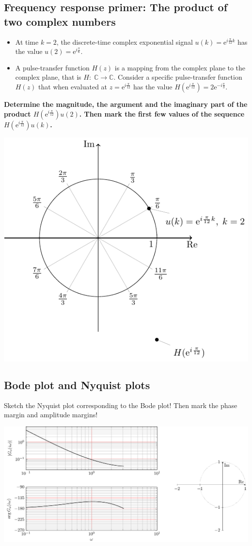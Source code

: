 \documentclass[letterpaper]{scrartcl}
\begin{document}
\subsection*{Frequency response primer: The product of two complex numbers}
\label{sec-1-2}
\begin{itemize}
\item At time \(k=2\), the discrete-time complex exponential signal \(u(k) = \mathrm{e}^{i\frac{\pi}{12}k}\) has the value \(u(2) = \mathrm{e}^{i\frac{\pi}{6}}\).
\item A pulse-transfer function \(H(z)\) is a mapping from the complex plane to the complex plane, that is \( H: \; \mathbb{C} \rightarrow \mathbb{C}\). Consider a specific pulse-transfer function \(H(z)\) that when evaluated at \(z=\mathrm{e}^{i\frac{\pi}{12}}\) has the value  \(H(\mathrm{e}^{i\frac{\pi}{12}}) = 2\mathrm{e}^{-i\frac{\pi}{3}}\).
\end{itemize}

\textbf{Determine the magnitude, the argument and the imaginary part of the product \(H(\mathrm{e}^{i\frac{\pi}{12}})u(2)\). Then mark the first few values of the sequence \(H(\mathrm{e}^{i\frac{\pi}{12}})u(k)\).}

\includegraphics[width=0.34\linewidth]{../../figures/imaginary-plane-two-points}


\subsection*{Bode plot and Nyquist plots}
\label{sec-1-3}
Sketch the Nyquist plot corresponding to the Bode plot! Then mark the phase margin and amplitude margins!
\begin{center}
\includegraphics[width=0.95\linewidth]{../../figures/bode-nyquist-exc-1}
\end{center}
\end{document}
